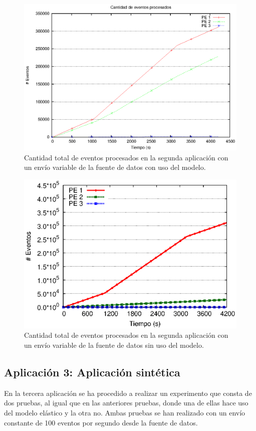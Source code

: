 \begin{figure}[!ht]
	\centering
    \includegraphics[scale=0.7]{images/exp/app2/normal/cm/eventCount.eps}
    \caption{Cantidad total de eventos procesados en la segunda aplicación con un envío variable de la fuente de datos con uso del modelo.}
    \label{fig:app2-normal-eventCount-cm}
\end{figure}

\begin{figure}[!ht]
	\centering
    \includegraphics[scale=0.7]{images/exp/app2/normal/sm/eventCount.eps}
    \caption{Cantidad total de eventos procesados en la segunda aplicación con un envío variable de la fuente de datos sin uso del modelo.}
    \label{fig:app2-normal-eventCount-sm}
\end{figure}

\subsection{Aplicación 3: Aplicación sintética}
En la tercera aplicación se ha procedido a realizar un experimento que consta de dos pruebas, al igual que en las anteriores pruebas, donde una de ellas hace uso del modelo elástico y la otra no. Ambas pruebas se han realizado con un envío constante de 100 eventos por segundo desde la fuente de datos.

